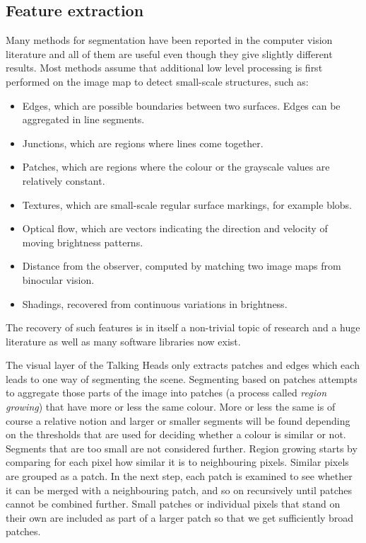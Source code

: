 \subsection{Feature extraction}

Many methods for segmentation have been reported 
in the computer vision literature and all of them are useful even though they 
give slightly different results. Most methods assume 
that additional low level processing is first performed 
on the image map to detect small-scale structures, such as: 
\begin{itemize}
\item Edges, which are possible boundaries between two 
surfaces. Edges can be aggregated in line segments. 
\item Junctions, which are regions where lines come 
together. 
\item Patches, which are regions where the colour or
the grayscale values are relatively constant. 
\item Textures, which are small-scale regular surface 
markings, for example blobs. 
\item Optical flow, which are vectors indicating the 
direction and velocity of moving brightness patterns. 
\item Distance from the observer, computed by
matching two image maps from binocular vision. 
\item Shadings, recovered from continuous variations in
brightness. 
\end{itemize}
The recovery of such features is in itself 
a non-trivial topic of research and a huge literature as well as 
many software libraries now exist.

The visual layer of the Talking Heads only extracts 
patches and edges which each leads to one way 
of segmenting the scene. 
Segmenting based on patches attempts to aggregate 
those parts of the image into patches (a process
called {\it region growing}) that have more or less the same 
colour. More or less the same is of course a relative
notion and larger or smaller segments will be found
depending on the thresholds that are used for 
deciding whether a colour is similar or not. Segments
that are too small are not considered further. 
Region growing starts by comparing for each pixel how similar it is to 
neighbouring pixels. Similar pixels
are grouped as a patch. In the next step, each patch
is examined to see whether it can be merged with
a neighbouring patch, and so on recursively until 
patches cannot be combined further. Small patches or individual pixels that 
stand on their own are included as part of a larger
patch so that we get sufficiently broad patches. 

